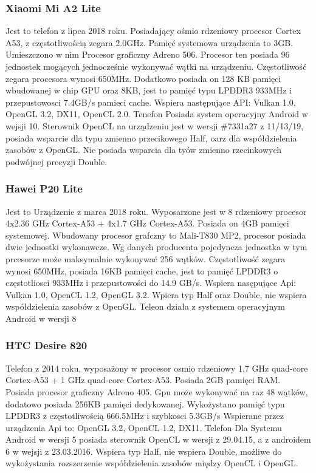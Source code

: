 \subsubsection[Xiaomi Mi A2 Lite]{Xiaomi Mi A2 Lite}
Jest to telefon z lipca 2018 roku. Posiadający ośmio rdzeniowy procesor Cortex A53, z częstotliwością zegara 2.0GHz. Pamięć systemowa urządzenia to 3GB. Umieszczono w nim Procesor graficzny Adreno 506. Procesor ten posiada 96 jednostek mogących jednocześnie wykonywać wątki na urządzeniu. Częstotliwość zegara procesora wynosi 650MHz. Dodatkowo posiada on 128 KB pamięci wbudowanej w chip GPU oraz 8KB, jest to pamięć typu LPDDR3 933MHz i przepustowosci 7.4GB/s pamieci cache. Wspiera następujące API: Vulkan 1.0, OpenGL 3.2, DX11, OpenCL 2.0. Tenefon Posiada system operacyjny Android w wejsji 10. Sterownik OpenCL na urządzeniu jest w wersji \#7331a27 z 11/13/19, posiada wsparcie dla typu zmienno przecikowego Half, oarz dla współdzielenia zasobów z OpenGL. Nie posiada wsparcia dla tyów zmienno rzecinkowych podwójnej precyzji Double.
\subsubsection[Hawei P20 Lite]{Hawei P20 Lite}
Jest to Urządzenie z marca 2018 roku. Wyposarzone jest w 8 rdzeniowy procesor 4x2.36 GHz Cortex-A53 + 4x1.7 GHz Cortex-A53. Posiada on 4GB pamięci systemowej. Wbudowany procesor grafczny to Mali-T830 MP2, procesor posiada dwie jednostki wykonawcze. Wg danych producenta pojedyncza jednostka w tym prcesorze może maksymalnie wykonywać 256 wątków. Częstotliwość zegara wynosi 650MHz, posiada 16KB pamięci cache, jest to pamięć LPDDR3 o częstotliosci 933MHz i przepustowości do 14.9 GB/s. Wspiera nasępujące Api: Vulkan 1.0, OpenCL 1.2, OpenGL 3.2. Wpiera typ Half oraz Double, nie wspiera współdzielenia zasobów z OpenGL. Teleon działa z systemem operacyjnym Android w wersji 8
\subsubsection[HTC Desire 820]{HTC Desire 820}
Telefon z 2014 roku, wyposażony w procesor osmio rdzeniowy 1,7 GHz quad-core Cortex-A53 + 1 GHz quad-core Cortex-A53. Posiada 2GB pamięci RAM. Posiada procesor graficzny Adreno 405. Gpu może wykonywać na raz 48 wątków, dodatowo posiada 256KB pamięci dedykowanej. Wykożystano pamięć typu LPDDR3 z częstotliwością 666.5MHz i szybkosci 5.3GB/s Wspierane przez urządzenia Api to: OpenGL 3.2, OpenCL 1.2, DX11. Telefon Dla Systemu Android w wersji 5 posiada sterownik OpenCL w wersji z 29.04.15, a z androidem 6 w wejsji z 23.03.2016. Wspiera typ Half, nie wspiera Double, możliwe do wykożystania rozszerzenie współdzielenia zasobów między OpenCL i OpenGL.
